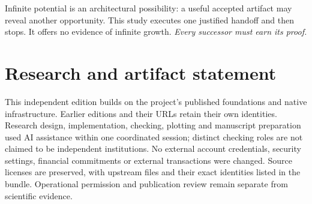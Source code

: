 Infinite potential is an architectural possibility: a useful accepted artifact may reveal another opportunity. This study executes one justified handoff and then stops. It offers no evidence of infinite growth. \emph{Every successor must earn its proof.}

\section*{Research and artifact statement}
This independent edition builds on the project's published foundations and native infrastructure. Earlier editions and their URLs retain their own identities. Research design, implementation, checking, plotting and manuscript preparation used AI assistance within one coordinated session; distinct checking roles are not claimed to be independent institutions. No external account credentials, security settings, financial commitments or external transactions were changed. Source licenses are preserved, with upstream files and their exact identities listed in the bundle. Operational permission and publication review remain separate from scientific evidence.
